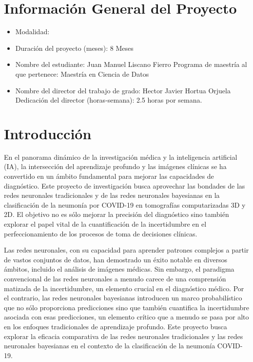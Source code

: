 \documentclass[10pt, oneside, a4paper]{article}
\newcommand{\cmark}{\ding{51}}%
\newcommand{\xmark}{\ding{55}}%
\newcommand{\done}{\rlap{$\square$}{\raisebox{2pt}{\large\hspace{1pt}\cmark}}%
	\hspace{-2.5pt}}
\newcommand{\wontfix}{\rlap{$\square$}{\large\hspace{1pt}\xmark}}
\begin{document}
	\newpage	
	\tableofcontents
	
	\newpage
	\listoffigures
	\listoftables
	
	
	\newpage
	
	\section*{Información General del Proyecto} \label{info_general}
	
	\begin{itemize}
		\item Modalidad:
		\item Duración del proyecto (meses): 8 Meses
		\item Nombre del estudiante: Juan Manuel Liscano Fierro
		\subitem Programa de maestría al que pertenece: Maestría en Ciencia de Datos
		\item Nombre del director del trabajo de grado: Hector Javier Hortua Orjuela
		\subitem Dedicación del director (horas-semana): 2.5 horas por semana.
		
	\end{itemize}

	\newpage
 	\section{Introducción} \label{introduccion}
	
	En el panorama dinámico de la investigación médica y la inteligencia artificial (IA), la intersección del aprendizaje profundo y las imágenes clínicas se ha convertido en un ámbito fundamental para mejorar las capacidades de diagnóstico. Este proyecto de investigación busca aprovechar las bondades de las redes neuronales tradicionales y de las redes neuronales bayesianas en la clasificación de la neumonía por COVID-19 en tomografías computarizadas 3D y 2D. El objetivo no es sólo mejorar la precisión del diagnóstico sino también explorar el papel vital de la cuantificación de la incertidumbre en el perfeccionamiento de los procesos de toma de decisiones clínicas.
	
	Las redes neuronales, con su capacidad para aprender patrones complejos a partir de vastos conjuntos de datos, han demostrado un éxito notable en diversos ámbitos, incluido el análisis de imágenes médicas. Sin embargo, el paradigma convencional de las redes neuronales a menudo carece de una comprensión matizada de la incertidumbre, un elemento crucial en el diagnóstico médico. Por el contrario, las redes neuronales bayesianas introducen un marco probabilístico que no sólo proporciona predicciones sino que también cuantifica la incertidumbre asociada con esas predicciones, un elemento crítico que a menudo se pasa por alto en los enfoques tradicionales de aprendizaje profundo. Este proyecto busca explorar la eficacia comparativa de las redes neuronales tradicionales y las redes neuronales bayesianas en el contexto de la clasificación de la neumonía COVID-19.
	
\end{document}
